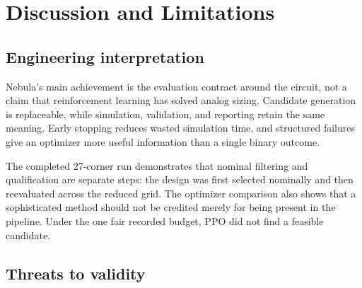 \chapter{Discussion and Limitations}

\section{Engineering interpretation}

Nebula's main achievement is the evaluation contract around the circuit, not a
claim that reinforcement learning has solved analog sizing. Candidate generation
is replaceable, while simulation, validation, and reporting retain the same
meaning. Early stopping reduces wasted simulation time, and structured failures
give an optimizer more useful information than a single binary outcome.

The completed 27-corner run demonstrates that nominal filtering and qualification
are separate steps: the design was first selected nominally and then reevaluated
across the reduced grid. The optimizer comparison also shows that a sophisticated
method should not be credited merely for being present in the pipeline. Under
the one fair recorded budget, PPO did not find a feasible candidate.

\section{Threats to validity}

